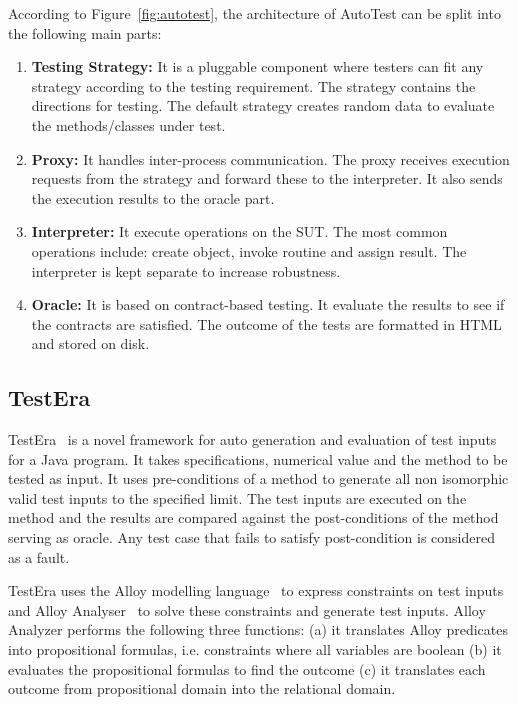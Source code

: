 \noindent According to Figure~\ref{fig:autotest}, the architecture of AutoTest can be split into the following main parts:
\begin{enumerate}
\item \textbf{Testing Strategy:} It is a pluggable component where testers can fit any strategy according to the testing requirement. The strategy contains the directions for testing.%
The default strategy creates random data to evaluate the methods/classes under test.
\item \textbf{Proxy:} It handles inter-process communication. The proxy receives execution requests from the strategy and forward these to the interpreter. It also sends the execution results to the oracle part.
\item \textbf{Interpreter:} It execute operations on the SUT. The most common operations include: create object, invoke routine and assign result. The interpreter is kept separate to increase robustness.
\item \textbf{Oracle:} It is based on contract-based testing. It evaluate the results to see if the contracts are satisfied. The outcome of the tests are formatted in HTML and stored on disk.
\end{enumerate}

\subsection{TestEra}
TestEra~\cite{marinov2001testera} is a novel framework for auto generation and evaluation of test inputs for a Java program. It takes specifications, numerical value and the method to be tested as input. It uses pre-conditions of a method to generate all non isomorphic valid test inputs to the specified limit. The test inputs are executed on the method and the results are compared against the post-conditions of the method serving as oracle. Any test case that fails to satisfy post-condition is considered as a fault. 

TestEra uses the Alloy modelling language~\cite{jackson2001micromodularity} to express constraints on test inputs and Alloy Analyser~\cite{jackson2000alcoa} to solve these constraints and generate test inputs. Alloy Analyzer performs the following three functions: (a) it translates Alloy predicates into propositional formulas, i.e. constraints where all variables are boolean (b) it evaluates the propositional formulas to find the outcome (c) it translates each outcome from propositional domain into the relational domain.

